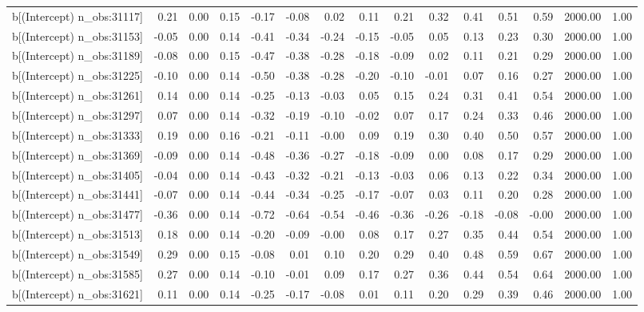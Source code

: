 \begin{table}[ht]
\begin{tabular}{rrrrrrrrrrrrrrr}
  b[(Intercept) n\_obs:31117] & 0.21 & 0.00 & 0.15 & -0.17 & -0.08 & 0.02 & 0.11 & 0.21 & 0.32 & 0.41 & 0.51 & 0.59 & 2000.00 & 1.00 \\ 
  b[(Intercept) n\_obs:31153] & -0.05 & 0.00 & 0.14 & -0.41 & -0.34 & -0.24 & -0.15 & -0.05 & 0.05 & 0.13 & 0.23 & 0.30 & 2000.00 & 1.00 \\ 
  b[(Intercept) n\_obs:31189] & -0.08 & 0.00 & 0.15 & -0.47 & -0.38 & -0.28 & -0.18 & -0.09 & 0.02 & 0.11 & 0.21 & 0.29 & 2000.00 & 1.00 \\ 
  b[(Intercept) n\_obs:31225] & -0.10 & 0.00 & 0.14 & -0.50 & -0.38 & -0.28 & -0.20 & -0.10 & -0.01 & 0.07 & 0.16 & 0.27 & 2000.00 & 1.00 \\ 
  b[(Intercept) n\_obs:31261] & 0.14 & 0.00 & 0.14 & -0.25 & -0.13 & -0.03 & 0.05 & 0.15 & 0.24 & 0.31 & 0.41 & 0.54 & 2000.00 & 1.00 \\ 
  b[(Intercept) n\_obs:31297] & 0.07 & 0.00 & 0.14 & -0.32 & -0.19 & -0.10 & -0.02 & 0.07 & 0.17 & 0.24 & 0.33 & 0.46 & 2000.00 & 1.00 \\ 
  b[(Intercept) n\_obs:31333] & 0.19 & 0.00 & 0.16 & -0.21 & -0.11 & -0.00 & 0.09 & 0.19 & 0.30 & 0.40 & 0.50 & 0.57 & 2000.00 & 1.00 \\ 
  b[(Intercept) n\_obs:31369] & -0.09 & 0.00 & 0.14 & -0.48 & -0.36 & -0.27 & -0.18 & -0.09 & 0.00 & 0.08 & 0.17 & 0.29 & 2000.00 & 1.00 \\ 
  b[(Intercept) n\_obs:31405] & -0.04 & 0.00 & 0.14 & -0.43 & -0.32 & -0.21 & -0.13 & -0.03 & 0.06 & 0.13 & 0.22 & 0.34 & 2000.00 & 1.00 \\ 
  b[(Intercept) n\_obs:31441] & -0.07 & 0.00 & 0.14 & -0.44 & -0.34 & -0.25 & -0.17 & -0.07 & 0.03 & 0.11 & 0.20 & 0.28 & 2000.00 & 1.00 \\ 
  b[(Intercept) n\_obs:31477] & -0.36 & 0.00 & 0.14 & -0.72 & -0.64 & -0.54 & -0.46 & -0.36 & -0.26 & -0.18 & -0.08 & -0.00 & 2000.00 & 1.00 \\ 
  b[(Intercept) n\_obs:31513] & 0.18 & 0.00 & 0.14 & -0.20 & -0.09 & -0.00 & 0.08 & 0.17 & 0.27 & 0.35 & 0.44 & 0.54 & 2000.00 & 1.00 \\ 
  b[(Intercept) n\_obs:31549] & 0.29 & 0.00 & 0.15 & -0.08 & 0.01 & 0.10 & 0.20 & 0.29 & 0.40 & 0.48 & 0.59 & 0.67 & 2000.00 & 1.00 \\ 
  b[(Intercept) n\_obs:31585] & 0.27 & 0.00 & 0.14 & -0.10 & -0.01 & 0.09 & 0.17 & 0.27 & 0.36 & 0.44 & 0.54 & 0.64 & 2000.00 & 1.00 \\ 
  b[(Intercept) n\_obs:31621] & 0.11 & 0.00 & 0.14 & -0.25 & -0.17 & -0.08 & 0.01 & 0.11 & 0.20 & 0.29 & 0.39 & 0.46 & 2000.00 & 1.00 \\ 

\end{tabular}
\end{table}
